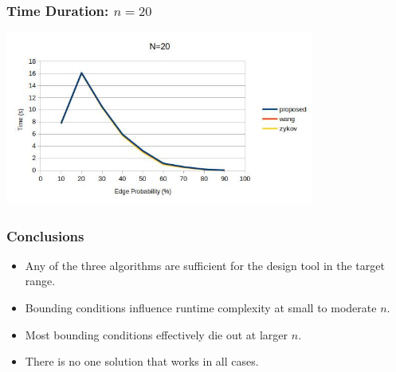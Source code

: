 \documentclass{beamer}
\begin{document}
\begin{frame}
  \frametitle{Time Duration: \(n=20\)}
  \begin{center}
    \includegraphics[width=4in]{../final/duration_20}
  \end{center}
\end{frame}

\begin{frame}
  \frametitle{Conclusions}
  \begin{itemize}
  \item Any of the three algorithms are sufficient for the design tool in the target range.
  \item Bounding conditions influence runtime complexity at small to moderate \(n\).
  \item Most bounding conditions effectively die out at larger \(n\).
  \item There is no one solution that works in all cases.
  \end{itemize}
\end{frame}
\end{document}
